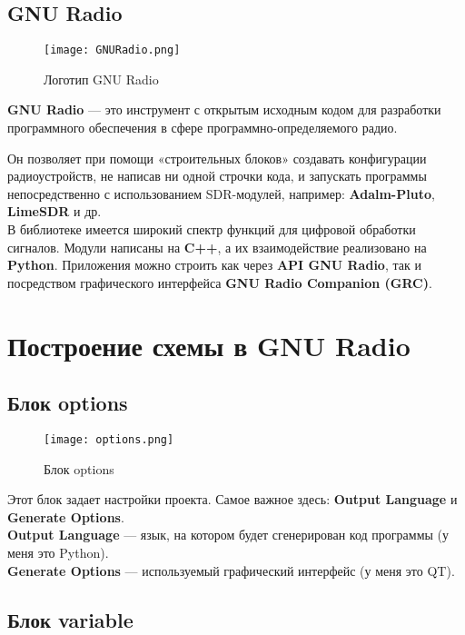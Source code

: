 \subsection*{\textbf{GNU Radio}}

\begin{figure}[H]
    \centering
    \texttt{[image: GNURadio.png]}
    \caption{Логотип GNU Radio}
\end{figure}

\textbf{GNU Radio} --- это инструмент с открытым исходным кодом для разработки программного обеспечения 
в сфере программно-определяемого радио. 

Он позволяет при помощи «строительных блоков» создавать конфигурации радиоустройств, не написав ни одной строчки кода, 
и запускать программы непосредственно с использованием SDR-модулей, например: \textbf{Adalm-Pluto}, \textbf{LimeSDR} и др. \\

В библиотеке имеется широкий спектр функций для цифровой обработки сигналов. Модули написаны на \textbf{C++}, 
а их взаимодействие реализовано на \textbf{Python}. Приложения можно строить как через \textbf{API GNU Radio}, 
так и посредством графического интерфейса \textbf{GNU Radio Companion (GRC)}.

\section*{\textbf{Построение схемы в GNU Radio}}

\subsection*{\textbf{Блок options}}

\begin{figure}[H]
    \centering
    \texttt{[image: options.png]}
    \caption{Блок options}
\end{figure}

Этот блок задает настройки проекта. Самое важное здесь: \textbf{Output Language} и \textbf{Generate Options}. \\
\textbf{Output Language} — язык, на котором будет сгенерирован код программы (у меня это Python). \\
\textbf{Generate Options} — используемый графический интерфейс (у меня это QT).

\subsection*{\textbf{Блок variable}}

